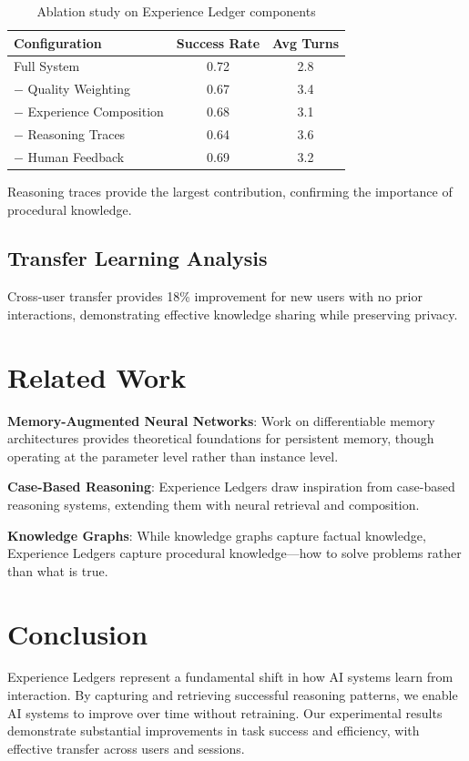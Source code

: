 \documentclass[11pt,letterpaper]{article}
\begin{document}
\begin{table}[h]
\centering
\caption{Ablation study on Experience Ledger components}
\label{tab:ablation}
\begin{tabular}{lcc}
\toprule
\textbf{Configuration} & \textbf{Success Rate} & \textbf{Avg Turns} \\
\midrule
Full System & 0.72 & 2.8 \\
$-$ Quality Weighting & 0.67 & 3.4 \\
$-$ Experience Composition & 0.68 & 3.1 \\
$-$ Reasoning Traces & 0.64 & 3.6 \\
$-$ Human Feedback & 0.69 & 3.2 \\
\bottomrule
\end{tabular}
\end{table}

Reasoning traces provide the largest contribution, confirming the importance of procedural knowledge.

\subsection{Transfer Learning Analysis}

Cross-user transfer provides 18\% improvement for new users with no prior interactions, demonstrating effective knowledge sharing while preserving privacy.

\section{Related Work}

\textbf{Memory-Augmented Neural Networks}: Work on differentiable memory architectures provides theoretical foundations for persistent memory, though operating at the parameter level rather than instance level.

\textbf{Case-Based Reasoning}: Experience Ledgers draw inspiration from case-based reasoning systems, extending them with neural retrieval and composition.

\textbf{Knowledge Graphs}: While knowledge graphs capture factual knowledge, Experience Ledgers capture procedural knowledge---how to solve problems rather than what is true.

\section{Conclusion}

Experience Ledgers represent a fundamental shift in how AI systems learn from interaction. By capturing and retrieving successful reasoning patterns, we enable AI systems to improve over time without retraining. Our experimental results demonstrate substantial improvements in task success and efficiency, with effective transfer across users and sessions.
\end{document}
